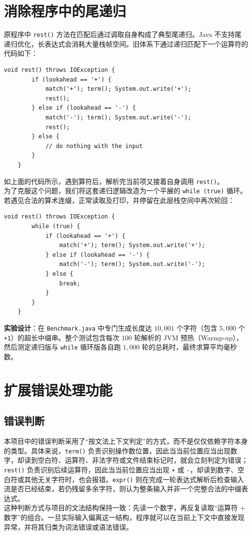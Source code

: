 \section{消除程序中的尾递归}
原程序中 \texttt{rest()} 方法在匹配后通过调取自身构成了典型尾递归。Java 不支持尾递归优化，长表达式会消耗大量栈帧空间。旧体系下通过递归匹配下一个运算符的代码如下：
\begin{lstlisting}[style=cleanjava]
    void rest() throws IOException {
        if (lookahead == '+') {
            match('+'); term(); System.out.write('+');
            rest();
        } else if (lookahead == '-') {
            match('-'); term(); System.out.write('-');
            rest();
        } else {
            // do nothing with the input
        }
    }
\end{lstlisting}
如上面的代码所示，遇到算符后，解析完当前项又接着自身调用 \texttt{rest()}。\\
为了克服这个问题，我们将这套递归逻辑改造为一个平展的 \texttt{while (true)} 循环。若遇见合法的算术连缀，正常读取及打印，并停留在此层栈空间中再次轮回：
\begin{lstlisting}[style=cleanjava]
    void rest() throws IOException {
        while (true) {
            if (lookahead == '+') {
                match('+'); term(); System.out.write('+');
            } else if (lookahead == '-') {
                match('-'); term(); System.out.write('-');
            } else {
                break;
            }
        }
    }
\end{lstlisting}
\textbf{实验设计}：在 \texttt{Benchmark.java} 中专门生成长度达 $10,001$ 个字符（包含 $5,000$ 个 \texttt{+1}）的超长中缀串。整个测试包含每次 $100$ 轮解析的 JVM 预热（Warmp-up），然后测定递归版与 \texttt{while} 循环版各自跑 $1,000$ 轮的总耗时，最终求算平均毫秒数。\\


\section{扩展错误处理功能}
\subsection{错误判断}
本项目中的错误判断采用了“按文法上下文判定”的方式，而不是仅仅依赖字符本身的类型。具体来说，\texttt{term()} 负责识别操作数位置，因此当当前位置应当出现数字，却读到空白符、运算符、非法字符或文件结束标记时，就会立刻判定为错误；\texttt{rest()} 负责识别后续运算符，因此当当前位置应当出现 \texttt{+} 或 \texttt{-}，却读到数字、空白符或其他无关字符时，也会报错。\texttt{expr()} 则在完成一轮表达式解析后检查输入流是否已经结束，若仍残留多余字符，则认为整条输入并非一个完整合法的中缀表达式。\\
这种判断方式与项目的文法结构保持一致：先读一个数字，再反复读取“运算符 + 数字”的组合。一旦实际输入偏离这一结构，程序就可以在当前上下文中直接发现异常，并将其归类为词法错误或语法错误。

